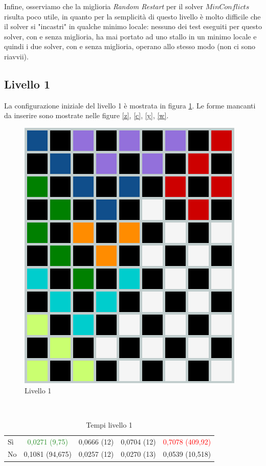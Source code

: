 Infine, osserviamo che la miglioria \textit{Random Restart} per il solver $MinConflicts$ risulta poco utile, in quanto per la semplicità di questo livello è molto difficile che il solver si "incastri" in qualche minimo locale: nessuno dei test eseguiti per questo solver, con e senza miglioria, ha mai portato ad uno stallo in un minimo locale e quindi i due solver, con e senza miglioria, operano allo stesso modo (non ci sono riavvii).
\subsection{Livello 1}
La configurazione iniziale del livello 1 è mostrata in figura \ref{lev1}. Le forme mancanti da inserire sono mostrate nelle figure \ref{z}, \ref{c}, \ref{y}, \ref{w}.
\begin{figure}[h]
	\centering
	\includegraphics[scale=0.3]{immagini/lv1}
	\caption{Livello 1}
	\label{lev1}
\end{figure}
\\
\noindent
\begin{table} [h]
	\begin{tabular}{|l||*{4}{c|}}\hline 
		\backslashbox{Miglioria}{Solver} 
		&\makebox{DFS}&\makebox{Backtracking}&\makebox{Recursive Backtracking}	&\makebox{MinConflicts}\\ \hline 
		Sì&\textcolor{ForestGreen}{0,0271 (9,75)}&0,0666 (12)&0,0704 (12)&\textcolor{red}{0,7078 (409,92)} \\ \hline 
		No&0,1081 (94,675)&0,0257 (12)&0,0270 (13)&0,0539 (10,518)  \\ \hline 
	\end{tabular} 
	\caption{Tempi livello 1}
\end{table}

